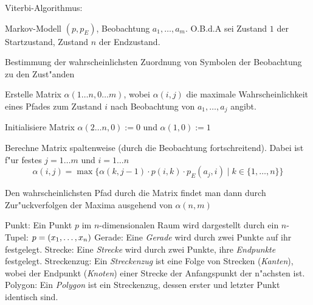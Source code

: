 \algorithm Viterbi-Algorithmus:{
  \given Markov-Modell $(p,p_E)$, Beobachtung $a_1,\ldots,a_m$. O.B.d.A sei
    Zustand $1$ der Startzustand, Zustand $n$ der Endzustand.
  
  \aim Bestimmung der wahrscheinlichsten Zuordnung von Symbolen
    der Beobachtung zu den Zust"anden
    
  \begin{proc}
    \item Erstelle Matrix $\alpha(1\ldots n,0\ldots m)$, wobei $\alpha(i,j)$
      die maximale Wahrscheinlichkeit eines Pfades zum Zustand $i$ 
      nach Beobachtung von $a_1,\ldots,a_j$ angibt.
    \item Initialisiere Matrix $\alpha(2\ldots n,0):=0$ und 
      $\alpha(1,0):=1$
    \item Berechne Matrix spaltenweise (durch die Beobachtung fortschreitend).
      Dabei ist f"ur festes $j=1\ldots m$ und $i=1\ldots n$
      \[
        \alpha(i,j)=\max
          \{ \alpha(k,j-1)\cdot p(i,k)\cdot p_E(a_j,i) \mid k\in\{1,\ldots,n\}\}
      \]
    \item Den wahrscheinlichsten Pfad durch die Matrix findet man dann durch
      Zur"uckverfolgen der Maxima ausgehend von $\alpha(n,m)$
  \end{proc}
}
 Punkt:{
  Ein Punkt $p$ im $n$-dimensionalen Raum wird dargestellt durch 
  ein $n$-Tupel: $p=(x_1,\ldots,x_n)$
}
 Gerade:{
  Eine \textit{Gerade} wird durch zwei Punkte auf ihr festgelegt.
}
 Strecke:{
  Eine \textit{Strecke} wird durch zwei Punkte, ihre \textit{Endpunkte}
  festgelegt.
}
 Streckenzug:{
  Ein \textit{Streckenzug} ist eine Folge von Strecken (\textit{Kanten}), 
  wobei der Endpunkt (\textit{Knoten}) einer Strecke der Anfangspunkt der 
  n"achsten ist.
}
 Polygon:{
  Ein \textit{Polygon} ist ein Streckenzug, dessen erster und letzter Punkt
  identisch sind.
}
